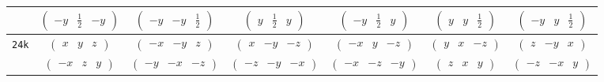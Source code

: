 \documentclass[fleqn,9pt,landscape]{jsarticle}
\begin{document}
\begin{center}
\begin{longtable}{ccccccc}
& $ \begin{pmatrix} - y & \frac{1}{2} & - y \end{pmatrix} $ & $ \begin{pmatrix} - y & - y & \frac{1}{2} \end{pmatrix} $ & $ \begin{pmatrix} y & \frac{1}{2} & y \end{pmatrix} $ & $ \begin{pmatrix} - y & \frac{1}{2} & y \end{pmatrix} $ & $ \begin{pmatrix} y & y & \frac{1}{2} \end{pmatrix} $ & $ \begin{pmatrix} - y & y & \frac{1}{2} \end{pmatrix} $ \\ \hline
{\tt 24k} & $ \begin{pmatrix} x & y & z \end{pmatrix} $ & $ \begin{pmatrix} - x & - y & z \end{pmatrix} $ & $ \begin{pmatrix} x & - y & - z \end{pmatrix} $ & $ \begin{pmatrix} - x & y & - z \end{pmatrix} $ & $ \begin{pmatrix} y & x & - z \end{pmatrix} $ & $ \begin{pmatrix} z & - y & x \end{pmatrix} $ \\
& $ \begin{pmatrix} - x & z & y \end{pmatrix} $ & $ \begin{pmatrix} - y & - x & - z \end{pmatrix} $ & $ \begin{pmatrix} - z & - y & - x \end{pmatrix} $ & $ \begin{pmatrix} - x & - z & - y \end{pmatrix} $ & $ \begin{pmatrix} z & x & y \end{pmatrix} $ & $ \begin{pmatrix} - z & - x & y \end{pmatrix} $ \\

\end{longtable}
\end{center}
\end{document}

